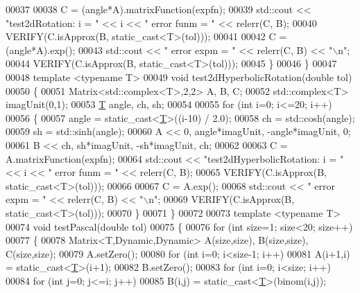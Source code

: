 \begin{DoxyCode}
00037 
00038     C = (angle*A).matrixFunction(expfn);
00039     std::cout << \textcolor{stringliteral}{"test2dRotation: i = "} << i << \textcolor{stringliteral}{"   error funm = "} << relerr(C, B);
00040     VERIFY(C.isApprox(B, static\_cast<T>(tol)));
00041 
00042     C = (angle*A).exp();
00043     std::cout << \textcolor{stringliteral}{"   error expm = "} << relerr(C, B) << \textcolor{stringliteral}{"\(\backslash\)n"};
00044     VERIFY(C.isApprox(B, static\_cast<T>(tol)));
00045   \}
00046 \}
00047 
00048 \textcolor{keyword}{template} <\textcolor{keyword}{typename} T>
00049 \textcolor{keywordtype}{void} test2dHyperbolicRotation(\textcolor{keywordtype}{double} tol)
00050 \{
00051   Matrix<std::complex<T>,2,2> A, B, C;
00052   std::complex<T> imagUnit(0,1);
00053   \hyperlink{group___sparse_core___module_class_eigen_1_1_triplet}{T} angle, ch, sh;
00054 
00055   \textcolor{keywordflow}{for} (\textcolor{keywordtype}{int} i=0; i<=20; i++)
00056   \{
00057     angle = \textcolor{keyword}{static\_cast<}\hyperlink{group___sparse_core___module_class_eigen_1_1_triplet}{T}\textcolor{keyword}{>}((i-10) / 2.0);
00058     ch = std::cosh(angle);
00059     sh = std::sinh(angle);
00060     A << 0, angle*imagUnit, -angle*imagUnit, 0;
00061     B << ch, sh*imagUnit, -sh*imagUnit, ch;
00062 
00063     C = A.matrixFunction(expfn);
00064     std::cout << \textcolor{stringliteral}{"test2dHyperbolicRotation: i = "} << i << \textcolor{stringliteral}{"   error funm = "} << relerr(C, B);
00065     VERIFY(C.isApprox(B, static\_cast<T>(tol)));
00066 
00067     C = A.exp();
00068     std::cout << \textcolor{stringliteral}{"   error expm = "} << relerr(C, B) << \textcolor{stringliteral}{"\(\backslash\)n"};
00069     VERIFY(C.isApprox(B, static\_cast<T>(tol)));
00070   \}
00071 \}
00072 
00073 \textcolor{keyword}{template} <\textcolor{keyword}{typename} T>
00074 \textcolor{keywordtype}{void} testPascal(\textcolor{keywordtype}{double} tol)
00075 \{
00076   \textcolor{keywordflow}{for} (\textcolor{keywordtype}{int} size=1; size<20; size++)
00077   \{
00078     Matrix<T,Dynamic,Dynamic> A(size,size), B(size,size), C(size,size);
00079     A.setZero();
00080     \textcolor{keywordflow}{for} (\textcolor{keywordtype}{int} i=0; i<size-1; i++)
00081       A(i+1,i) = \textcolor{keyword}{static\_cast<}\hyperlink{group___sparse_core___module_class_eigen_1_1_triplet}{T}\textcolor{keyword}{>}(i+1);
00082     B.setZero();
00083     \textcolor{keywordflow}{for} (\textcolor{keywordtype}{int} i=0; i<size; i++)
00084       \textcolor{keywordflow}{for} (\textcolor{keywordtype}{int} j=0; j<=i; j++)
00085     B(i,j) = \textcolor{keyword}{static\_cast<}\hyperlink{group___sparse_core___module_class_eigen_1_1_triplet}{T}\textcolor{keyword}{>}(binom(i,j));

\end{DoxyCode}
